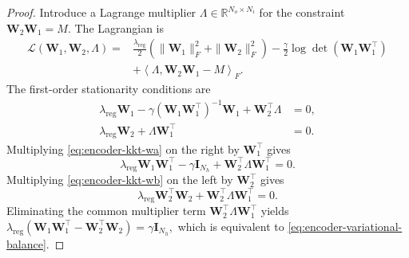 \documentclass{article} %
\newcommand{\wa}{\mathbf{W}_1}
\newcommand{\wb}{\mathbf{W}_2}
\theoremstyle{remark}
\begin{document}
\begin{proof}
Introduce a Lagrange multiplier
$\Lambda\in\mathbb{R}^{N_o\times N_i}$
for the constraint \(\wb\wa=M\). The Lagrangian is
\begin{equation}
\begin{aligned}
\mathscr{L}(\wa,\wb,\Lambda)
={}&
\frac{\lambda_{\mathrm{reg}}}{2}
\left(
    \|\wa\|_F^2+\|\wb\|_F^2
\right)
-
\frac{\gamma}{2}
\log\det\left(\wa\wa^\top\right)
\\
&+
\left\langle
    \Lambda,\wb\wa-M
\right\rangle_F.
\end{aligned}
\label{eq:encoder-constrained-lagrangian}
\end{equation}
The first-order stationarity conditions are
\begin{align}
\lambda_{\mathrm{reg}}\wa
-
\gamma
\left(\wa\wa^\top\right)^{-1}\wa
+
\wb^\top\Lambda
&=0,
\label{eq:encoder-kkt-wa}
\\
\lambda_{\mathrm{reg}}\wb
+
\Lambda\wa^\top
&=0.
\label{eq:encoder-kkt-wb}
\end{align}
Multiplying \eqref{eq:encoder-kkt-wa} on the right by \(\wa^\top\)
gives
\begin{equation}
\lambda_{\mathrm{reg}}\wa\wa^\top
-
\gamma\mathbf{I}_{N_h}
+
\wb^\top\Lambda\wa^\top
=0.
\label{eq:encoder-kkt-gram-wa}
\end{equation}
Multiplying \eqref{eq:encoder-kkt-wb} on the left by \(\wb^\top\)
gives
\begin{equation}
\lambda_{\mathrm{reg}}\wb^\top\wb
+
\wb^\top\Lambda\wa^\top
=0.
\label{eq:encoder-kkt-gram-wb}
\end{equation}
Eliminating the common multiplier term
\(\wb^\top\Lambda\wa^\top\) yields
$
\lambda_{\mathrm{reg}}
\left(
    \wa\wa^\top-\wb^\top\wb
\right)
=
\gamma\mathbf{I}_{N_h},
$
which is equivalent to
\eqref{eq:encoder-variational-balance}.
\end{proof}
\end{document}
